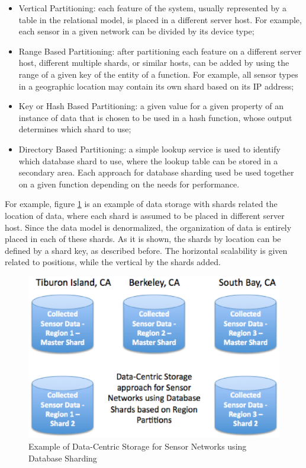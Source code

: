 \begin{itemize}
  \item Vertical Partitioning: each feature of the system, usually represented
  by a table in the relational model, is placed in a different server host. For
  example, each sensor in a given network can be divided by its device type;
  \item Range Based Partitioning: after partitioning each feature on a
  different server host, different multiple shards, or similar hosts, can be
  added by using the range of a given key of the entity of a function. For
  example, all sensor types in a geographic location may contain its own shard
  based on its IP address;
  \item Key or Hash Based Partitioning: a given value for a given property of
  an instance of data that is chosen to be used in a hash function, whose
  output determines which shard to use;
  \item Directory Based Partitioning: a simple lookup service is used to
  identify which database shard to use, where the lookup table can be stored
  in a secondary area. Each approach for database sharding used be used
  together on a given function depending on the needs for performance.
\end{itemize}

For example, figure \ref{fig:database-sharding-by-region} is an example of
data storage with shards \cite{db-shard01} related the location of data, where
each shard is assumed to be placed in different server host. Since the data
model is denormalized, the organization of data is entirely placed in each of
these shards. As it is shown, the shards by location can be defined by a shard
key, as described before. The horizontal scalability is given related to
positions, while the vertical by the shards added.

\begin{figure}
  \centering
  \includegraphics[scale=0.65]{../diagrams/database-sharding-by-region}
  \caption{Example of Data-Centric Storage for Sensor Networks using Database
  Sharding}
  \label{fig:database-sharding-by-region}
\end{figure}

